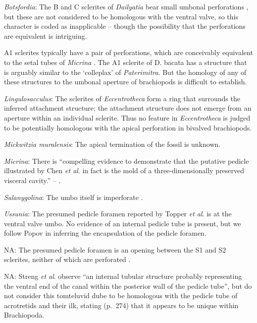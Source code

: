 \documentclass[openany]{book}
\theoremstyle{definition}
\theoremstyle{definition}
\theoremstyle{definition}
\theoremstyle{remark}
\begin{document}
\hypertarget{Botsfordia-coding-114}{}
\emph{Botsfordia}: The B and C sclerites of \emph{Dailyatia} bear small
umbonal perforations \citep{Skovsted2015Theearly}, but these are not
considered to be homologous with the ventral valve, so this character is
coded as inapplicable -- though the possibility that the perforations
are equivalent is intriguing.

A1 sclerites typically have a pair of perforations, which are
conceivably equivalent to the setal tubes of \emph{Micrina}
\citep{Holmer2011Firstrecord}. The A1 sclerite of D. bacata has a
structure that is arguably similar to the `colleplax' of
\emph{Paterimitra}. But the homology of any of these structures to the
umbonal aperture of brachiopods is difficult to establish.

\hypertarget{Lingulosacculus-coding-114}{}
\emph{Lingulosacculus}: The sclerites of \emph{Eccentrotheca} form a
ring that surrounds the inferred attachment structure; the attachment
structure does not emerge from an aperture within an individual
sclerite. Thus no feature in \emph{Eccentrotheca} is judged to be
potentially homologous with the apical perforation in bivalved
brachiopods.

\hypertarget{Mickwitzia_muralensis-coding-114}{}
\emph{Mickwitzia muralensis}: The apical termination of the fossil is
unknown.

\hypertarget{Micrina-coding-114}{}
\emph{Micrina}: There is ``compelling evidence to demonstrate that the
putative pedicle\\
illustrated by Chen \emph{et al}. \citeyearpar[Figs. 4, 6,
7]{Chen2007Reinterpretationof} in fact is the mold of a
three-dimensionally preserved visceral cavity.'' --
\citet{Zhang2009Architectureand}.

\hypertarget{Salanygolina-coding-114}{}
\emph{Salanygolina}: The umbo itself is imperforate
\citep{Balthasar2004Shellstructure}.

\hypertarget{Ussunia-coding-114}{}
\emph{Ussunia}: The presumed pedicle foramen reported by Topper \emph{et
al}. \citeyearpar{Topper2013Reappraisalof} is at the ventral valve umbo.
No evidence of an internal pedicle tube is present, but we follow Popov
\citeyearpar{Popov1992TheCambrian} in inferring the encapsulation of the
pedicle foramen.

\hypertarget{NA-coding-114}{}
NA: The presumed pedicle foramen is an opening between the S1 and S2
sclerites, neither of which are perforated
\citep{Skovsted2009Thescleritome}.

\hypertarget{NA-coding-114}{}
NA: Streng \emph{et al}. \citeyearpar{Streng2016Anew} observe ``an
internal tubular structure probably representing the ventral end of the
canal within the posterior wall of the pedicle tube'', but do not
consider this tomteluvid dube to be homologous with the pedicle tube of
acrotretids and their ilk, stating (p.~274) that it appears to be unique
within Brachiopoda.
\end{document}
